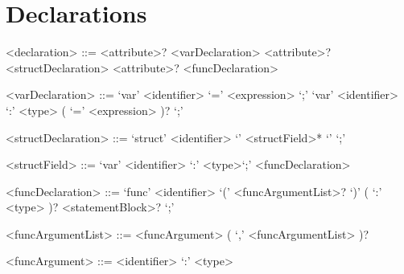 \section{Declarations}

\setlength{\grammarparsep}{20pt plus 1pt minus 1pt}
\setlength{\grammarindent}{10em}
\begin{grammar}

<declaration> ::= <attribute>? <varDeclaration>
\alt <attribute>? <structDeclaration>
\alt <attribute>? <funcDeclaration>

<varDeclaration> ::= `var' <identifier> `=' <expression> `;'
\alt `var' <identifier> `:' <type> ( `=' <expression> )? `;'

<structDeclaration> ::= `struct' <identifier> `{' <structField>* `}' `;'

<structField> ::= `var' <identifier> `:' <type>`;'
\alt <funcDeclaration>

<funcDeclaration> ::= `func' <identifier> `(' <funcArgumentList>? `)' ( `:' <type> )? <statementBlock>? `;'

<funcArgumentList> ::= <funcArgument> ( `,' <funcArgumentList> )?

<funcArgument> ::= <identifier> `:' <type>

\end{grammar}
